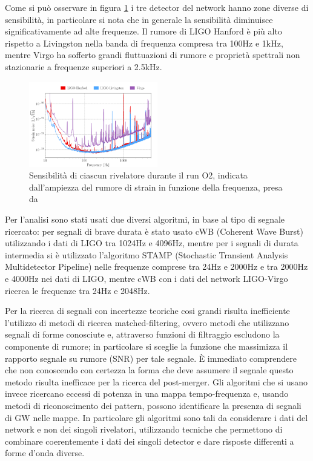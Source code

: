 Come si può osservare in figura \ref{fig:NoiseFrequenze} i tre detector del network hanno zone diverse di sensibilità, in particolare si nota che in generale la sensibilità diminuisce significativamente ad alte frequenze. Il rumore di LIGO Hanford è più alto rispetto a Livingston nella banda di frequenza compresa tra 100Hz e 1kHz, mentre Virgo ha sofferto grandi fluttuazioni di rumore e proprietà spettrali non stazionarie a frequenze superiori a 2.5kHz.
\begin{figure}
	\vspace{-0pt}
	\begin{center}
		\includegraphics[width=0.5\textwidth]{figures/Capitolo_2/noiseData.png}
	\end{center}
	\vspace{-5pt}
	\caption{Sensibilità di ciascun rivelatore durante il run O2, indicata dall'ampiezza del rumore di strain in funzione della frequenza, presa da \cite{Abbott_2019}}
	\label{fig:NoiseFrequenze}
	\vspace{-10pt}
\end{figure}
Per l'analisi sono stati usati due diversi algoritmi, in base al tipo di segnale ricercato: per segnali di brave durata è stato usato cWB (Coherent Wave Burst) utilizzando i dati di LIGO tra 1024Hz e 4096Hz, mentre per i segnali di durata intermedia si è utilizzato l'algoritmo STAMP (Stochastic Transient Analysis Multidetector Pipeline) nelle frequenze comprese tra 24Hz e 2000Hz e tra 2000Hz e 4000Hz nei dati di LIGO, mentre cWB con i dati del network LIGO-Virgo ricerca le frequenze tra 24Hz e 2048Hz. 

Per la ricerca di segnali con incertezze teoriche cosi grandi risulta inefficiente l'utilizzo di metodi di ricerca matched-filtering, ovvero metodi che utilizzano segnali di forme conosciute e, attraverso funzioni di filtraggio escludono la componente di rumore; in particolare si sceglie la funzione che massimizza il rapporto segnale su rumore (SNR) per tale segnale\cite{maggiore2008gravitational}. È immediato comprendere che non conoscendo con certezza la forma che deve assumere il segnale questo metodo risulta inefficace per la ricerca del post-merger. Gli algoritmi che si usano invece ricercano eccessi di potenza in una mappa tempo-frequenza e, usando metodi di riconoscimento dei pattern, possono identificare la presenza di segnali di GW nelle mappe. In particolare gli algoritmi sono tali da considerare i dati del network e non dei singoli rivelatori, utilizzando tecniche che permettono di combinare coerentemente i dati dei singoli detector e dare risposte differenti a forme d'onda diverse.

